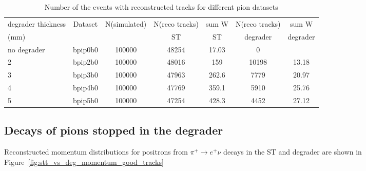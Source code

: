 \begin{table}[H]
\begin{tabularx}{1.0\textwidth} {|X|c|c|c|c|c|c|}  %
  \hline
 degrader thickness &   Dataset  &N(simulated) & N(reco tracks) & sum W   & N(reco tracks) & sum W        \\
 (mm)               &            &             &     ST         &   ST    &    degrader    &  degrader    \\
  \hline                                                                          
  no degrader       &   bpip0b0  &  100000     &    48254       &  17.03  &     0          &              \\
  \hline                                                                          
     2              &   bpip2b0  &  100000     &    48016       &   159    &   10198       &   13.18      \\
  \hline                                                                         
     3              &   bpip3b0  &  100000     &    47963       &   262.6  &    7779       &   20.97       \\
  \hline                                                                         
     4              &   bpip4b0  &  100000     &    47769       &   359.1  &    5910       &   25.76       \\
  \hline                                                                          
     5              &   bpip5b0  &  100000     &    47254        &  428.3  &    4452       &   27.12       \\
  \hline
\end{tabularx}
  \caption{
    Number of the events with reconstructed tracks for different pion datasets
  }
\end{table}

\newpage
\subsection{Decays of pions stopped in the degrader}

Reconstructed momentum distributions for positrons from $\pi^+ \to e^+ \nu$ decays
in the ST and degrader are shown in Figure~\ref{fig:stt_vs_deg_momentum_good_tracks}


